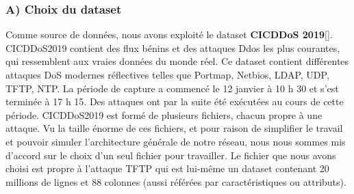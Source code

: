 \subsubsection{A) Choix du dataset }
Comme source de données, nous avons exploité le dataset \textbf{ CICDDoS 2019}[\cite{21}]. CICDDoS2019 contient des flux bénins et des attaques Ddos les plus courantes, qui ressemblent aux vraies données du monde réel. Ce dataset contient différentes attaques DoS modernes réflectives telles que Portmap, Netbios, LDAP, UDP, TFTP, NTP. La période de capture a commencé le 12 janvier à 10 h 30 et s’est terminée à 17 h 15. Des attaques ont par la suite été exécutées au cours de cette période.
\newpage
CICDDoS2019 est formé de plusieurs fichiers, chacun propre à une attaque. Vu la taille énorme de ces fichiers, et pour raison de simplifier le travail et pouvoir simuler l'architecture générale de notre réseau, nous nous sommes mis d’accord sur le choix d'un seul fichier pour travailler. Le fichier que nous avons choisi est propre à l'attaque TFTP qui est lui-même un dataset contenant 20 millions de lignes et 88 colonnes (aussi référées par caractéristiques ou attributs).

